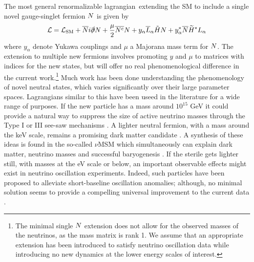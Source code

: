 \documentclass[11pt, a4paper]{article}
\def\lagrangian{lagrangian}
\def\ster{\ensuremath N}
\begin{document}
The most general renormalizable \lagrangian\ extending the SM to include a
single novel gauge-singlet fermion $\ster$ is given by
%
\begin{align}   \mathcal{L} = \mathcal{L}_\text{SM} +
\overline{\ster}i\slashed{\partial}\ster+ \frac{\mu}{2}
\overline{\ster^\text{c}}\ster  + y_\alpha\overline{L}_\alpha\tilde{H} \ster +
y_\alpha^* \overline{\ster}\widetilde{H}^*L_\alpha\label{eq:minimallag}
\end{align}
%
where $y_\alpha$ denote Yukawa couplings and $\mu$ a Majorana mass term for
$\ster$. The extension to multiple new fermions involves promoting $y$ and
$\mu$ to matrices with indices for the new states, but will offer no real
phenomenological difference in the current work.\footnote{The minimal single
$\ster$ extension does not allow for the observed masses of the neutrinos, as
the mass matrix is rank 1. We assume that an appropriate extension has been
introduced to satisfy neutrino oscillation data while introducing no new
dynamics at the lower energy scales of interest.} Much work has been done
understanding the phenomenology of novel neutral states, which varies
significantly over their large parameter spaces. 
%
Lagrangians similar to this have been useed in the literature for a wide range
of purposes. If the new particle has a mass around $10^{15}$ GeV it could
provide a natural way to suppress the size of active neutrino masses through
the Type I or III see-saw mechanisms \cite{Minkowski:1977sc, GellMann:1980vs,
Mohapatra:1979ia}. A lighter neutral fermion, with a mass around the keV scale,
remains a promising dark matter candidate \cite{Adhikari:2016bei}. A synthesis
of these ideas is found in the so-called $\nu$MSM which simultaneously can
explain dark matter, neutrino masses and successful baryogenesis
\cite{Asaka:2005pn}. 
%
If the sterile gets lighter still, with masses at the eV scale or below, an
important observable effects might exist in neutrino oscillation experiments.
Indeed, such particles have been proposed to alleviate short-baseline
oscillation anomalies; although, no minimal solution seems to provide a
compelling universal improvement to the current data \cite{Kopp:2013vaa}. 
\end{document}
